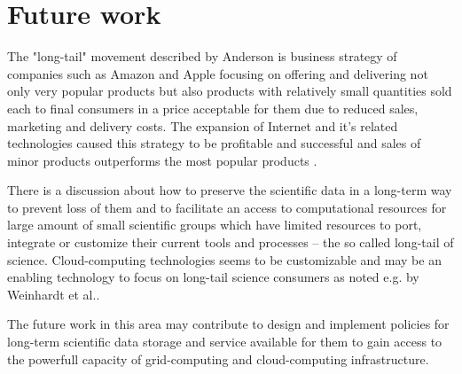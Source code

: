 
\section{Future work}

The "long-tail" movement described by Anderson \cite{Anderson2006} is business strategy of companies such as Amazon and Apple focusing on offering and delivering not only very popular products but also products with relatively small quantities sold each to final consumers in a price acceptable for them  due to reduced sales, marketing and delivery costs. The expansion of Internet and it's related technologies caused this strategy to be profitable and successful and sales of minor products outperforms the most popular products .

 
There is a discussion about how to preserve the scientific data in a long-term way to prevent loss of them  \cite{Vines2014,P.BryanHeidorn2008} and to facilitate an access to computational resources for large amount of small scientific groups which have limited resources to port, integrate or customize their current tools and processes -- the so called long-tail of science. Cloud-computing technologies seems to be customizable and may be an enabling technology to focus on long-tail science consumers as noted e.g. by Weinhardt et al.\cite{Weinhardt2009}. 

The future work in this area may contribute to design and implement policies for long-term scientific data storage and service available for them to gain access to the powerfull capacity of grid-computing and cloud-computing infrastructure. 

